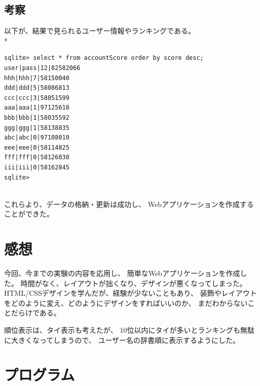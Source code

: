 \documentclass[a4j]{jarticle}
\begin{document}
\newpage
\subsection{考察}
以下が、結果で見られるユーザー情報やランキングである。\\*
\begin{screen}
\begin{verbatim}
sqlite> select * from accountScore order by score desc;
user|pass|12|82582066
hhh|hhh|7|58150040
ddd|ddd|5|58086813
ccc|ccc|3|58051599
aaa|aaa|1|97125618
bbb|bbb|1|58035592
ggg|ggg|1|58138835
abc|abc|0|97108010
eee|eee|0|58114825
fff|fff|0|58126030
iii|iii|0|58162845
sqlite> 
\end{verbatim}
\end{screen}\\

これらより、データの格納・更新は成功し、
Webアプリケーションを作成することができた。

\section{感想}
今回、今までの実験の内容を応用し、
簡単なWebアプリケーションを作成した。
時間がなく、レイアウトが拙くなり、デザインが悪くなってしまった。
HTML/CSSデザインを学んだが、経験が少ないこともあり、
装飾やレイアウトをどのように変え、どのようにデザインをすればいいのか、
まだわからないことだらけである。

順位表示は、タイ表示も考えたが、
10位以内にタイが多いとランキングも無駄に大きくなってしまうので、
ユーザー名の辞書順に表示するようにした。

\section{プログラム}




\end{document}
